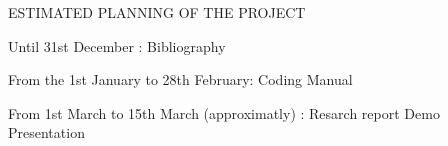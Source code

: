 														ESTIMATED PLANNING OF THE PROJECT

Until 31st December : 
	Bibliography

From the 1st January to 28th February:
	Coding
	Manual

From 1st March to 15th March (approximatly) :
	Resarch report
	Demo
	Presentation